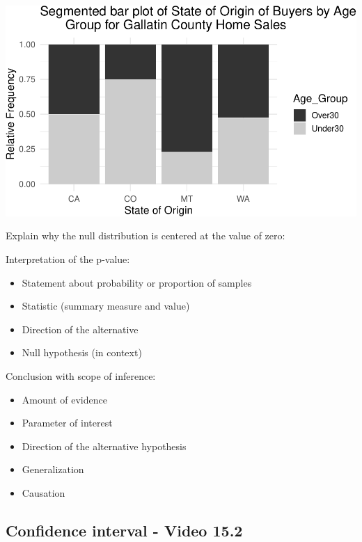 \documentclass[
]{report}
\begin{document}
\begin{center}\includegraphics[width=0.7\linewidth]{08-VN08-two-cat-simulation_files/figure-latex/unnamed-chunk-5-1} \end{center}

Explain why the null distribution is centered at the value of zero:

\vspace{1in}

Interpretation of the p-value:

\begin{itemize}
\item
  Statement about probability or proportion of samples
\item
  Statistic (summary measure and value)
\item
  Direction of the alternative
\item
  Null hypothesis (in context)
\end{itemize}

\vspace{0.8in}

Conclusion with scope of inference:

\begin{itemize}
\item
  Amount of evidence
\item
  Parameter of interest
\item
  Direction of the alternative hypothesis
\item
  Generalization
\item
  Causation
\end{itemize}

\vspace{0.8in}

\newpage

\subsection*{Confidence interval - Video 15.2}\label{confidence-interval---video-15.2}
\end{document}

